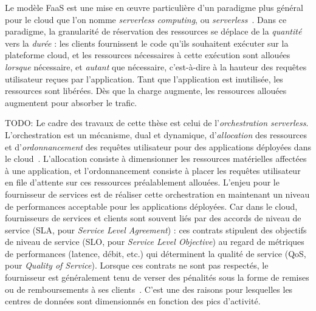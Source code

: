 Le modèle FaaS est une mise en œuvre particulière d'un paradigme plus général pour le cloud que l'on nomme \textit{serverless computing}, ou \textit{serverless}~\cite{hellersteinServerlessComputingOne2019}. Dans ce paradigme, la granularité de réservation des ressources se déplace de la \textit{quantité} vers la \textit{durée} : les clients fournissent le code qu'ils souhaitent exécuter sur la plateforme cloud, et les ressources nécessaires à cette exécution sont allouées \textit{lorsque} nécessaire, et \textit{autant} que nécessaire, c'est-à-dire à la hauteur des requêtes utilisateur reçues par l'application. Tant que l'application est inutilisée, les ressources sont libérées. Dès que la charge augmente, les ressources allouées augmentent pour absorber le trafic.

TODO: Le cadre des travaux de cette thèse est celui de l'\textit{orchestration serverless}. L'orchestration est un mécanisme, dual et dynamique, d'\textit{allocation} des ressources et d'\textit{ordonnancement} des requêtes utilisateur pour des applications déployées dans le cloud~\cite{vaneykSPECRGReferenceArchitecture2019}. L'allocation consiste à dimensionner les ressources matérielles affectées à une application, et l'ordonnancement consiste à placer les requêtes utilisateur en file d'attente sur ces ressources préalablement allouées. L'enjeu pour le fournisseur de services est de réaliser cette orchestration en maintenant un niveau de performances acceptable pour les applications déployées. Car dans le cloud, fournisseurs de services et clients sont souvent liés par des accords de niveau de service (SLA, pour \textit{Service Level Agreement}) : ces contrats stipulent des objectifs de niveau de service (SLO, pour \textit{Service Level Objective}) au regard de métriques de performances (latence, débit, etc.) qui déterminent la qualité de service (QoS, pour \textit{Quality of Service}). Lorsque ces contrats ne sont pas respectés, le fournisseur est généralement tenu de verser des pénalités sous la forme de remises ou de remboursements à ses clients~\cite{buyyaSLAorientedResourceProvisioning2011}. C'est une des raisons pour lesquelles les centres de données sont dimensionnés en fonction des pics d'activité.

